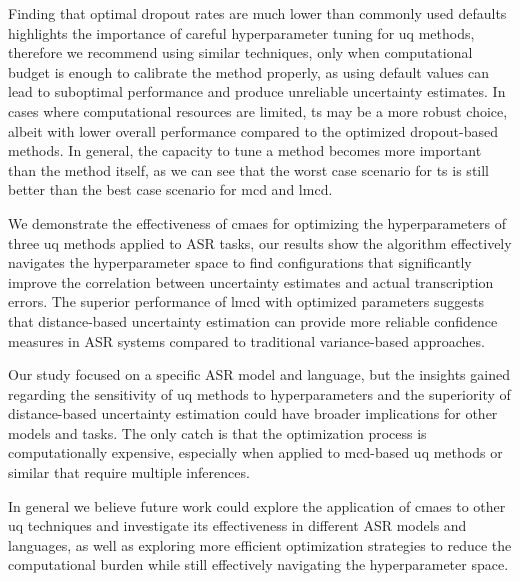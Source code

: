 \documentclass[11pt]{article}
\begin{document}
Finding that optimal dropout rates are much lower than commonly used defaults highlights the importance of careful hyperparameter tuning for \acrshort{uq} methods, therefore we recommend using similar techniques, only when computational budget is enough to calibrate the method properly, as using default values can lead to suboptimal performance and produce unreliable uncertainty estimates. In cases where computational resources are limited, \acrshort{ts} may be a more robust choice, albeit with lower overall performance compared to the optimized dropout-based methods. In general, the capacity to tune a method becomes more important than the method itself, as we can see that the worst case scenario for \acrshort{ts} is still better than the best case scenario for \acrshort{mcd} and \acrshort{lmcd}.

We demonstrate the effectiveness of \acrshort{cmaes} for optimizing the hyperparameters of three \acrshort{uq} methods applied to ASR tasks, our results show the algorithm effectively navigates the hyperparameter space to find configurations that significantly improve the correlation between uncertainty estimates and actual transcription errors. The superior performance of \acrshort{lmcd} with optimized parameters suggests that distance-based uncertainty estimation can provide more reliable confidence measures in ASR systems compared to traditional variance-based approaches.

Our study focused on a specific ASR model and language, but the insights gained regarding the sensitivity of \acrshort{uq} methods to hyperparameters and the superiority of distance-based uncertainty estimation could have broader implications for other models and tasks. The only catch is that the optimization process is computationally expensive, especially when applied to \acrshort{mcd}-based \acrshort{uq} methods or similar that require multiple inferences.

In general we believe future work could explore the application of \acrshort{cmaes} to other \acrshort{uq} techniques and investigate its effectiveness in different ASR models and languages, as well as exploring more efficient optimization strategies to reduce the computational burden while still effectively navigating the hyperparameter space.



\end{document}
